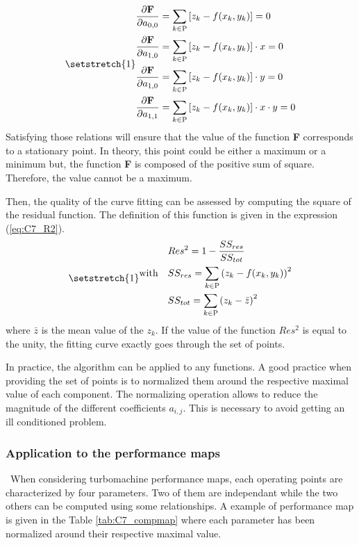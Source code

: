 \begin{subequations}
\setstretch{1}
\begin{align}
    \frac{\partial \textbf{F}}{\partial a_{0,0}} &=\sum_{k\in\textsc{P}}\left[z_k - f(x_k, y_k)\right] = 0\\
    \frac{\partial \textbf{F}}{\partial a_{1,0}} &=\sum_{k\in\textsc{P}}\left[z_k - f(x_k, y_k)\right]\cdot x = 0\\
    \frac{\partial \textbf{F}}{\partial a_{1,0}} &=\sum_{k\in\textsc{P}}\left[z_k - f(x_k, y_k)\right]\cdot y = 0\\
    \frac{\partial \textbf{F}}{\partial a_{1,1}} &=\sum_{k\in\textsc{P}}\left[z_k - f(x_k, y_k)\right]\cdot x \cdot y = 0
\end{align}\label{eq:C7_lqcond}
\end{subequations}
Satisfying those relations will ensure that the value of the function \textbf{F} corresponds to a stationary point. In theory, this point could be either a maximum or a minimum but, the function \textbf{F} is composed of the positive sum of square. Therefore, the value cannot be a maximum. 

Then, the quality of the curve fitting can be assessed by computing the square of the residual function. The definition of this function is given in the expression (\ref{eq:C7_R2}).
\begin{equation}
\setstretch{1}
\begin{aligned}
& & &  Res^2 = 1 - \frac{SS_{res}}{SS_{tot}} \\
&\text{with}
& & SS_{res} = \sum_{k\in\textsc{P}}\left(z_k - f(x_k,y_k)\right)^2\\
& & & SS_{tot} = \sum_{k\in\textsc{P}}\left(z_k - \bar{z}\right)^2
\end{aligned}\label{eq:C7_R2}
\end{equation}
where $\bar{z}$ is the mean value of the $z_k$. If the value of the function $Res^2$ is equal to the unity, the fitting curve exactly goes through the set of points. 

In practice, the algorithm can be applied to any functions. A good practice when providing the set of points is to normalized them around the respective maximal value of each component. The normalizing operation allows to reduce the magnitude of the different coefficients $a_{i,j}$. This is necessary to avoid getting an ill conditioned problem.

\subsubsection{Application to the performance maps}
\quad\ When considering turbomachine performance maps, each operating points are characterized by four parameters. Two of them are independant while the two others can be computed using some relationships. A example of performance map is given in the Table \ref{tab:C7_compmap} where each parameter has been normalized around their respective maximal value.

